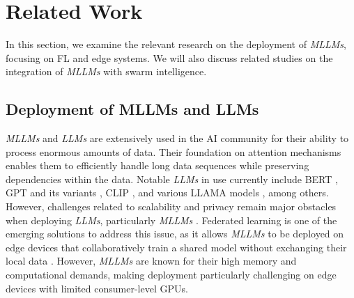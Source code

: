 \section{Related Work}
\label{section2}
In this section, we examine the relevant research on the deployment of \textit{MLLMs}, focusing on FL and edge systems. We will also discuss related studies on the integration of \textit{MLLMs} with swarm intelligence.

\subsection{Deployment of MLLMs and LLMs}
\textit{MLLMs} and \textit{LLMs} are extensively used in the AI community for their ability to process enormous amounts of data. Their foundation on attention mechanisms enables them to efficiently handle long data sequences while preserving dependencies within the data. Notable \textit{LLMs} in use currently include BERT \cite{tang2023fusionai, mudvari2024splitllm, jiang2024low, liu2023differentially}, GPT and its variants \cite{tang2023fusionai, mudvari2024splitllm, kou2024pfedlvm, liu2023differentially}, CLIP \cite{atapour2024leveraging, zhang2024mllm}, and various LLAMA models \cite{dong2024fine, zhao2024llm, liu2023differentially, ye2024openfedllm, wu2024fedbiot, kuang2024federatedscope}, among others. However, challenges related to scalability and privacy remain major obstacles when deploying \textit{LLMs}, particularly \textit{MLLMs} \cite{krishnamoorthy2024integrating, kurkute2023scalable}. Federated learning is one of the emerging solutions to address this issue, as it allows \textit{MLLMs} to be deployed on edge devices that collaboratively train a shared model without exchanging their local data \cite{kurkute2023scalable,yao2024federated,ye2024openfedllm}. However, \textit{MLLMs} are known for their high memory and computational demands, making deployment particularly challenging on edge devices with limited consumer-level GPUs. 

